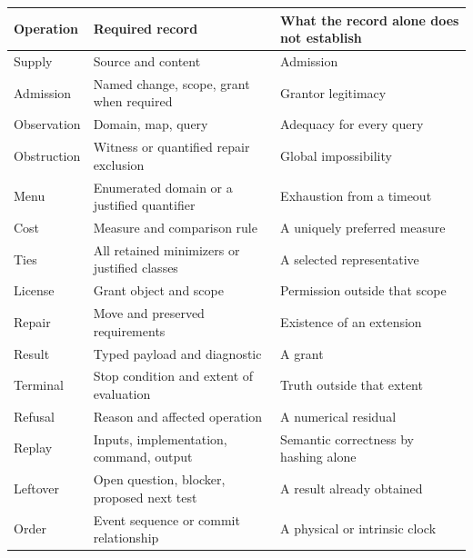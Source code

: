 \documentclass[
  11pt,
]{article}
\begin{document}
\begin{longtable}[]{@{}
  >{\raggedright\arraybackslash}p{}
  >{\raggedright\arraybackslash}p{}
  >{\raggedright\arraybackslash}p{}@{}}
\toprule\noalign{}
\begin{minipage}[b]{\linewidth}\raggedright
Operation
\end{minipage} & \begin{minipage}[b]{\linewidth}\raggedright
Required record
\end{minipage} & \begin{minipage}[b]{\linewidth}\raggedright
What the record alone does not establish
\end{minipage} \\
\midrule\noalign{}
\endhead
\bottomrule\noalign{}
\endlastfoot
Supply & Source and content & Admission \\
Admission & Named change, scope, grant when required & Grantor legitimacy \\
Observation & Domain, map, query & Adequacy for every query \\
Obstruction & Witness or quantified repair exclusion & Global impossibility \\
Menu & Enumerated domain or a justified quantifier & Exhaustion from a timeout \\
Cost & Measure and comparison rule & A uniquely preferred measure \\
Ties & All retained minimizers or justified classes & A selected representative \\
License & Grant object and scope & Permission outside that scope \\
Repair & Move and preserved requirements & Existence of an extension \\
Result & Typed payload and diagnostic & A grant \\
Terminal & Stop condition and extent of evaluation & Truth outside that extent \\
Refusal & Reason and affected operation & A numerical residual \\
Replay & Inputs, implementation, command, output & Semantic correctness by hashing alone \\
Leftover & Open question, blocker, proposed next test & A result already obtained \\
Order & Event sequence or commit relationship & A physical or intrinsic clock \\
\end{longtable}
\end{document}
